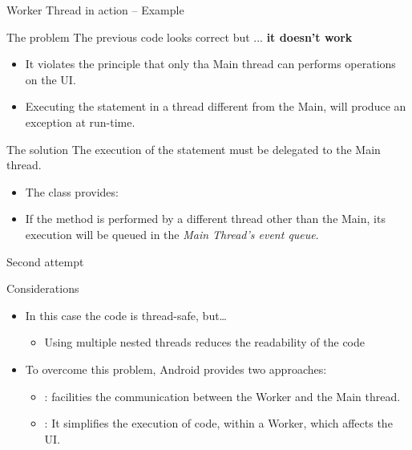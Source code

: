 \documentclass{beamer}
\begin{document}
  \begin{frame}{Worker Thread in action -- Example}
   \begin{alertblock}{The problem}
    The previous code looks correct but ... \textbf{it doesn't work}
    \begin{itemize}
      \item It violates the principle that only tha Main thread can performs
      operations on the UI.
      \item Executing the  statement in a
      thread different from the Main, will produce an exception at run-time.
    \end{itemize} 
   \end{alertblock}
   \begin{exampleblock}{The solution}
    The execution of the statement must be delegated to the Main thread.
    \begin{itemize}
      \item The  class provides:   
      \item If the method is performed by a different thread other than the
      Main, its execution will be queued in the \textit{Main Thread's event queue}.
    \end{itemize} 
   \end{exampleblock}

   \begin{exampleblock}{Second attempt}
      
   \end{exampleblock}

   \begin{block}{Considerations}
    \begin{itemize}
      \item In this case the code is thread-safe, but\dots
      \begin{itemize}
        \item Using multiple nested threads reduces the readability of the code 
      \end{itemize}
      \item To overcome this problem, Android provides two approaches:
      \begin{itemize}
        \item {}: facilities the communication between the Worker and
        the Main thread.
        \item {}: It simplifies the execution of code, within a
        Worker, which affects the UI. 
      \end{itemize}
    \end{itemize} 
   \end{block}
  \end{frame}
\end{document}

